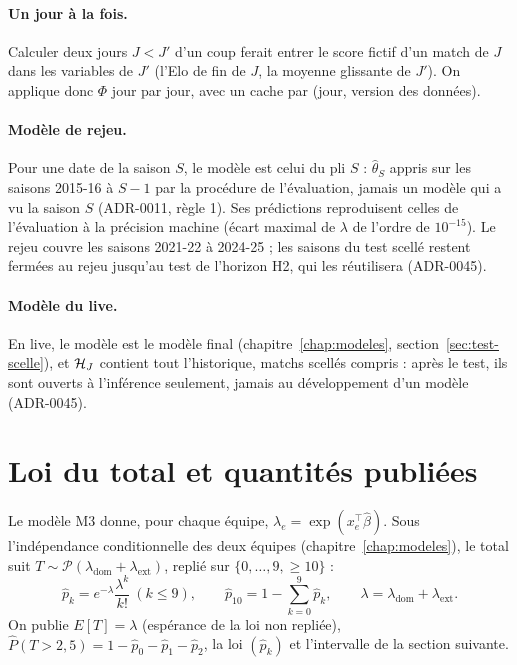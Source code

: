 \paragraph{Un jour à la fois.} Calculer deux jours \(J < J'\) d'un coup ferait entrer le score fictif
d'un match de \(J\) dans les variables de \(J'\) (l'Elo de fin de \(J\), la moyenne glissante de
\(J'\)). On applique donc \(\Phi\) jour par jour, avec un cache par (jour, version des données).

\paragraph{Modèle de rejeu.} Pour une date de la saison \(S\), le modèle est celui du pli \(S\) :
\(\hat\theta_S\) appris sur les saisons 2015-16 à \(S - 1\) par la procédure de l'évaluation, jamais
un modèle qui a vu la saison \(S\) (ADR-0011, règle 1). Ses prédictions reproduisent celles de
l'évaluation à la précision machine (écart maximal de \(\lambda\) de l'ordre de \(10^{-15}\)). Le rejeu
couvre les saisons 2021-22 à 2024-25 ; les saisons du test scellé restent fermées au rejeu jusqu'au
test de l'horizon H2, qui les réutilisera (ADR-0045).

\paragraph{Modèle du live.} En live, le modèle est le modèle final (chapitre~\ref{chap:modeles},
section~\ref{sec:test-scelle}), et \(\mathcal{H}_J\) contient tout l'historique, matchs scellés compris : après le
test, ils sont ouverts à l'inférence seulement, jamais au développement d'un modèle (ADR-0045).

\section{Loi du total et quantités publiées}
\label{sec:inference-loi}

Le modèle M3 donne, pour chaque équipe, \(\lambda_e = \exp(x_e^\top \hat\beta)\). Sous l'indépendance
conditionnelle des deux équipes (chapitre~\ref{chap:modeles}), le total suit
\(T \sim \mathcal{P}(\lambda_{\mathrm{dom}} + \lambda_{\mathrm{ext}})\), replié sur
\(\{0, \dots, 9, \ge 10\}\) :
\[
  \hat p_k = e^{-\lambda}\frac{\lambda^k}{k!} \ (k \le 9),
  \qquad
  \hat p_{10} = 1 - \sum_{k=0}^{9} \hat p_k,
  \qquad \lambda = \lambda_{\mathrm{dom}} + \lambda_{\mathrm{ext}} .
\]
On publie \(E[T] = \lambda\) (espérance de la loi non repliée), \(\hat P(T > 2{,}5) = 1 - \hat p_0 -
\hat p_1 - \hat p_2\), la loi \((\hat p_k)\) et l'intervalle de la section suivante.

